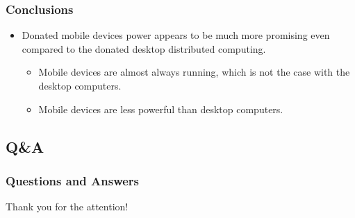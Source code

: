 \documentclass{beamer}
\begin{document}
\begin{frame}
\frametitle{Conclusions}
\begin{itemize}
  \item Donated mobile devices power appears to be much more promising even compared to the donated desktop distributed computing.
  \begin{itemize}
    \item Mobile devices are almost always running, which is not the case with the desktop computers.
    \item Mobile devices are less powerful than desktop computers.
  \end{itemize}
\end{itemize}
\end{frame}

\subsection{Q\&A}

\begin{frame}
\frametitle{Questions and Answers}
\center \huge{Thank you for the attention!}
\end{frame}
\end{document}
